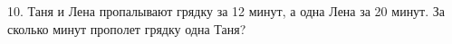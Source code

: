 10. Таня и Лена пропалывают грядку за 12 минут, а одна Лена за 20 минут. За сколько минут прополет грядку одна Таня?\\

